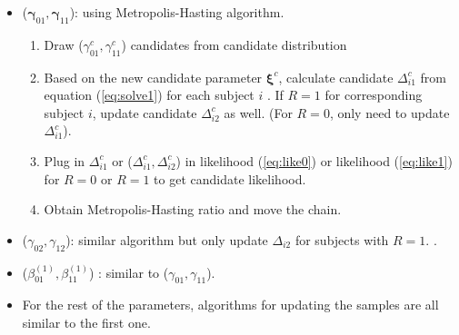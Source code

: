 \documentclass[12pt]{article}
\begin{document}
\begin{itemize}
\item ($\bm \gamma_{01}, \bm \gamma_{11}$): using Metropolis-Hasting
  algorithm.
  \begin{enumerate}
  \item Draw ($\gamma_{01}^c, \gamma_{11}^c$) candidates from
    candidate distribution
  \item Based on the new candidate parameter $\bm \xi^c$, calculate
    candidate $\Delta_{i1}^c$ from equation (\ref{eq:solve1}) for each
    subject $i$ . If $R = 1$ for corresponding subject $i$, update
    candidate $\Delta_{i2}^c$ as well. (For $R = 0$, only need to
    update $\Delta_{i1}^c$).
  \item Plug in $\Delta_{i1}^c$ or ($\Delta_{i1}^c, \Delta_{i2}^c$) in
    likelihood (\ref{eq:like0}) or likelihood (\ref{eq:like1}) for $R
    = 0$ or $R = 1$ to get candidate likelihood.
  \item Obtain Metropolis-Hasting ratio and move the chain.
  \end{enumerate}
\item ($\gamma_{02}, \gamma_{12}$): similar algorithm but only update
  $\Delta_{i2}$ for subjects with $R = 1$. .
\item ($\beta_{01}^{(1)}, \beta_{11}^{(1)}$) : similar to
  ($\gamma_{01}, \gamma_{11}$).
\item For the rest of the parameters, algorithms for updating the
  samples are all similar to the first one.
\end{itemize}
\end{document}
